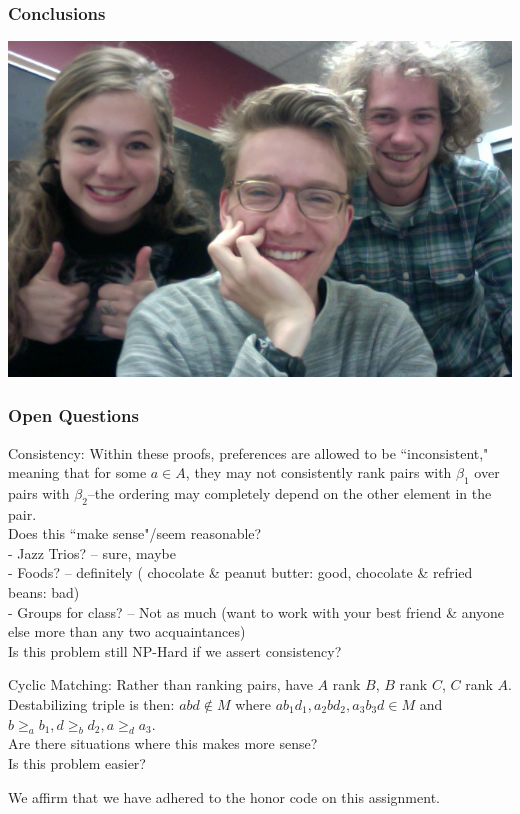 \documentclass[mathserif,serif]{beamer}
\newcommand{\honor}{We affirm that we have adhered to the honor code on this assignment.}
\begin{document}
\begin{frame}

	\frametitle{Conclusions}
	
	\includegraphics[width=\textwidth]{us}
	
\end{frame}

\begin{frame}

	\frametitle{Open Questions}
		
	Consistency: Within these proofs, preferences are allowed to be ``inconsistent," meaning that for some $a \in A$, they may not consistently rank pairs with $\beta_1$ over pairs with $\beta_2$--the ordering may completely depend on the other element in the pair. \\
	
		Does this ``make sense"/seem reasonable?\\ 
			- Jazz Trios? -- sure, maybe\\
			- Foods? -- definitely ( chocolate \& peanut butter: good, chocolate \& refried beans: bad)\\
			- Groups for class? -- Not as much (want to work with your best friend \& anyone else more than any two acquaintances)\\
			
	Is this problem still NP-Hard if we assert consistency?
	
	Cyclic Matching: Rather than ranking pairs, have $A$ rank $B$, $B$ rank $C$, $C$ rank $A$.  
	Destabilizing triple is then: $abd \notin M$ where $a b_1 d_1, a_2 b d_2, a_3 b_3 d \in M$ and $b \geq_a b_1, d \geq_b d_2, a \geq_d a_3$.\\
	
	Are there situations where this makes more sense?\\ %
	Is this problem easier?
	 
\end{frame}

\begin{frame}
	\honor
\end{frame}

\end{document}

